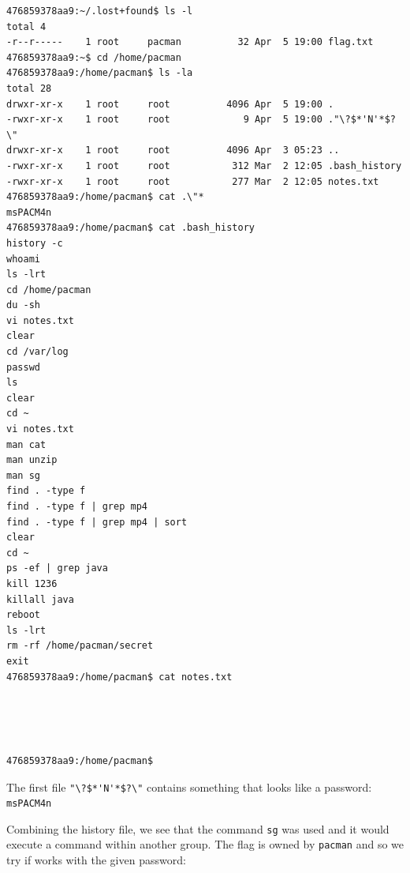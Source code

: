 \documentclass[english,a4paper,nols,noindent]{tufte-handout}
\begin{document}
\begin{verbatim}
476859378aa9:~/.lost+found$ ls -l
total 4
-r--r-----    1 root     pacman          32 Apr  5 19:00 flag.txt
476859378aa9:~$ cd /home/pacman
476859378aa9:/home/pacman$ ls -la
total 28
drwxr-xr-x    1 root     root          4096 Apr  5 19:00 .
-rwxr-xr-x    1 root     root             9 Apr  5 19:00 ."\?$*'N'*$?\"
drwxr-xr-x    1 root     root          4096 Apr  3 05:23 ..
-rwxr-xr-x    1 root     root           312 Mar  2 12:05 .bash_history
-rwxr-xr-x    1 root     root           277 Mar  2 12:05 notes.txt
476859378aa9:/home/pacman$ cat .\"*
msPACM4n
476859378aa9:/home/pacman$ cat .bash_history
history -c
whoami
ls -lrt
cd /home/pacman
du -sh
vi notes.txt
clear
cd /var/log
passwd
ls
clear
cd ~
vi notes.txt
man cat
man unzip
man sg
find . -type f
find . -type f | grep mp4
find . -type f | grep mp4 | sort
clear
cd ~
ps -ef | grep java
kill 1236
killall java
reboot
ls -lrt
rm -rf /home/pacman/secret
exit
476859378aa9:/home/pacman$ cat notes.txt
\end{verbatim} 
\noindent
\textltshade\textblock\textupblock\textupblock
\textltshade\textblock\textupblock\textblock
\textltshade\textblock
\textltshade\textblock\textupblock\textupblock
\textltshade\textltshade\textblock\textupblock\textupblock
\textltshade\textblock\textupblock\textblock
\textltshade\textblock
\textltshade\textblock\\
\noindent
\textltshade\textblock\textupblock\textupblock
\textltshade\textblock\textupblock\textupblock
\textltshade\textblock
\textltshade\textblock\textltshade\textltshade
\textltshade\textltshade\textblock\textupblock\textupblock
\textltshade\textblock\textupblock\textblock
\textltshade\textblock
\textltshade\textblock\\
\noindent
\textltshade\textupblock\textupblock\textupblock
\textltshade\textupblock\textltshade\textltshade
\textltshade\textupblock
\textltshade\textupblock\textupblock\textupblock
\textltshade\textltshade\textupblock\textltshade\textltshade
\textltshade\textupblock\textltshade\textupblock
\textltshade\textupblock
\textltshade\textupblock\textupblock\textupblock\\
\begin{verbatim}
476859378aa9:/home/pacman$ 
\end{verbatim} 


The first file \verb+"\?$*'N'*$?\"+ contains something that looks like a
password: \verb+msPACM4n+

Combining the history file, we see that the command \verb+sg+ was used and it
would execute a command within another group.  The flag is owned by
\verb+pacman+ and so we try if works with the given password:
\end{document}

